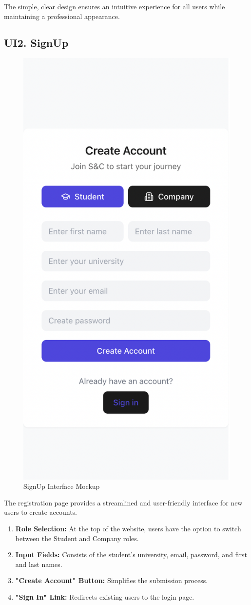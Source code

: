 The simple, clear design ensures an intuitive experience for all users while maintaining a professional appearance.

\subsection{UI2. SignUp}
\label{subsec:signup_ui}%

\begin{figure}[H]
    \begin{center}
        \includegraphics[width=0.52\linewidth]{JhaBhatiaSharma/imagesDD/SignUp.png}
        \caption{SignUp Interface Mockup}
        \label{fig:signupinterface}
    \end{center}
\end{figure}

The registration page provides a streamlined and user-friendly interface for new users to create accounts.

\begin{enumerate}
    \item \textbf{Role Selection:} At the top of the website, users have the option to switch between the Student and Company roles.
    \item \textbf{Input Fields:} Consists of the student's university, email, password, and first and last names.
    \item \textbf{"Create Account" Button:} Simplifies the submission process.
    \item \textbf{"Sign In" Link:} Redirects existing users to the login page.
\end{enumerate}

